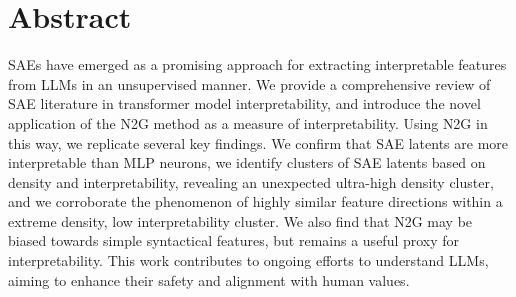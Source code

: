 \section*{Abstract}

\Acp{SAE} have emerged as a promising approach for extracting interpretable features from \acp{LLM} in an unsupervised manner.
We provide a comprehensive review of \ac{SAE} literature in transformer model interpretability, and introduce the novel application of the \ac{N2G} method as a measure of interpretability.
Using \ac{N2G} in this way, we replicate several key findings.
We confirm that \ac{SAE} latents are more interpretable than \ac{MLP} neurons, we identify clusters of \ac{SAE} latents based on density and interpretability, revealing an unexpected ultra-high density cluster, and we corroborate the phenomenon of highly similar feature directions within a extreme density, low interpretability cluster.
We also find that \ac{N2G} may be biased towards simple syntactical features, but remains a useful proxy for interpretability.
This work contributes to ongoing efforts to understand \acp{LLM}, aiming to enhance their safety and alignment with human values.
